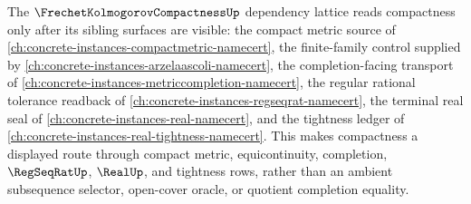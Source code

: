 The $\FrechetKolmogorovCompactnessUp$ dependency lattice reads compactness only after its sibling surfaces are visible: the compact metric source of \autoref{ch:concrete-instances-compactmetric-namecert}, the finite-family control supplied by \autoref{ch:concrete-instances-arzelaascoli-namecert}, the completion-facing transport of \autoref{ch:concrete-instances-metriccompletion-namecert}, the regular rational tolerance readback of \autoref{ch:concrete-instances-regseqrat-namecert}, the terminal real seal of \autoref{ch:concrete-instances-real-namecert}, and the tightness ledger of \autoref{ch:concrete-instances-real-tightness-namecert}. This makes compactness a displayed route through compact metric, equicontinuity, completion, $\RegSeqRatUp$, $\RealUp$, and tightness rows, rather than an ambient subsequence selector, open-cover oracle, or quotient completion equality.
